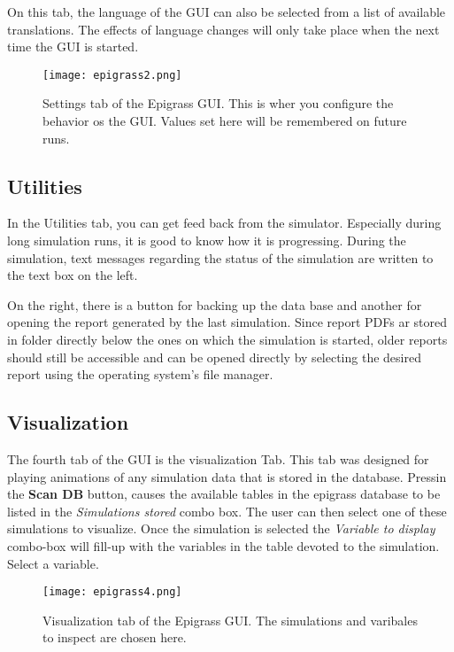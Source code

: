 \documentclass[a4paper,10pt]{manual}
\begin{document}
On this tab, the language of the GUI can also be selected from a list of available translations. The effects of language changes will only take place when the next time the GUI is started.
\begin{figure}[htbp]
\centering

\texttt{[image: epigrass2.png]}
\caption{Settings tab of the Epigrass GUI. This is wher you configure the behavior os the GUI. Values set here will be remembered on future runs.}\end{figure}


\subsection{Utilities}

In the Utilities tab, you can get feed back from the simulator. Especially during long simulation runs, it is good to know how it is progressing. During the simulation, text messages regarding the status of the simulation are written to the text box on the left.

On the right, there is a button for backing up the data base and another for opening the report generated by the last simulation. Since report PDFs ar stored in folder directly below the ones on which the simulation is started, older reports should still be accessible and can be opened directly by selecting the desired report using the operating system's file manager.


\subsection{Visualization}

The fourth tab of the GUI is the visualization Tab. This tab was designed for playing animations of any simulation data that is stored in the database. Pressin the \textbf{Scan DB} button, causes the available tables in the  epigrass database to be listed in the \emph{Simulations stored} combo box. The user can then select one of these simulations to visualize. Once the simulation is selected the \emph{Variable to display} combo-box will fill-up with the variables in the table devoted to the simulation. Select a variable.
\begin{figure}[htbp]
\centering

\texttt{[image: epigrass4.png]}
\caption{Visualization tab of the Epigrass GUI. The simulations and varibales to inspect are chosen here.}\end{figure}
\end{document}
